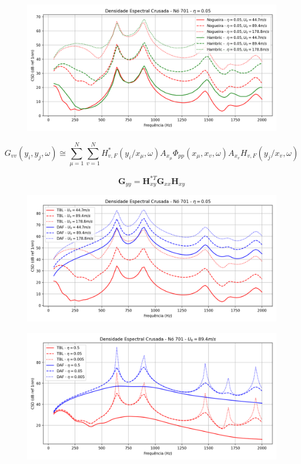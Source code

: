 \documentclass[9pt,a4paper,twoside]{rho-class/rho}
\begin{document}
\begin{figure}[H]
	\centering
	\includegraphics[width=0.9\columnwidth]{figures/csd_comp.png}
	\caption{}
	\label{fig:comp}
\end{figure}



\begin{equation}
	G_{vv}(y_i,y_j,\omega)\cong\sum_{\mu=1}^N\sum_{v=1}^NH_{v,F}^*(y_i/x_\mu,\omega)A_{x_\mu}\Phi_{pp}(x_\mu,x_v,\omega)A_{x_v}H_{v,F}(y_j/x_v,\omega)
\end{equation}

\begin{equation}
	\mathbf{G}_{yy}=\mathbf{H}_{xy}^{*T}\mathbf{G}_{xx}\mathbf{H}_{xy}
\end{equation}


\begin{figure}[H]
	\centering
	\includegraphics[width=0.9\columnwidth]{figures/csd_vel.png}
	\caption{}
	\label{fig:csdvel}
\end{figure}

\begin{figure}[H]
	\centering
	\includegraphics[width=0.9\columnwidth]{figures/csd_eta.png}
	\caption{}
	\label{fig:csdeta}
\end{figure}



\printbibliography

\end{document}
